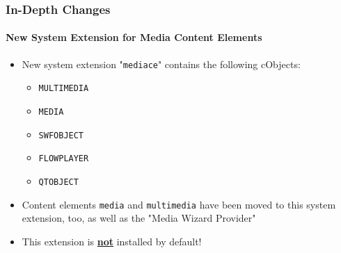 \begin{frame}[fragile]
	\frametitle{In-Depth Changes}
	\framesubtitle{New System Extension for Media Content Elements}

	\begin{itemize}

		\item New system extension "\texttt{mediace}" contains the following cObjects:

			\begin{itemize}
				\item \texttt{MULTIMEDIA}
				\item \texttt{MEDIA}
				\item \texttt{SWFOBJECT}
				\item \texttt{FLOWPLAYER}
				\item \texttt{QTOBJECT}
			\end{itemize}

		\item Content elements \texttt{media} and \texttt{multimedia} have been moved to
			this system extension, too, as well as the "Media Wizard Provider"

		\item This extension is \underline{\textbf{not}} installed by default!

	\end{itemize}

\end{frame}

